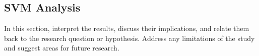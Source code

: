 \subsection{SVM Analysis} %
\label{subsec:discussion-SVM}

In this section, interpret the results, discuss their implications, and relate them back to the research question or hypothesis. Address any limitations of the study and suggest areas for future research.


